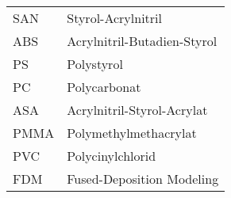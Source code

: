 \begin{table}[h]
    \begin{tabular}{@{}ll@{}}%
        SAN & Styrol-Acrylnitril\\
        ABS & Acrylnitril-Butadien-Styrol\\
        PS & Polystyrol\\
        PC & Polycarbonat\\
        ASA & Acrylnitril-Styrol-Acrylat\\
        PMMA & Polymethylmethacrylat\\
        PVC & Polycinylchlorid\\
        FDM & Fused-Deposition Modeling\\
    \end{tabular}%
\label{tab:glossar}
\end{table}